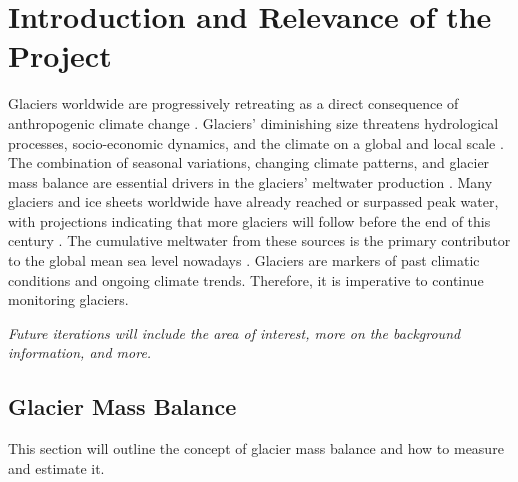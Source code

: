 \section{Introduction and Relevance of the Project}\label{introduction}
Glaciers worldwide are progressively retreating as a direct consequence of anthropogenic climate change \cite{immerzeel-2019, marzeion-2014, hugonnet-2021}. Glaciers' diminishing size threatens hydrological processes, socio-economic dynamics, and the climate on a global and local scale \cite{roberts-2022}. The combination of seasonal variations, changing climate patterns, and glacier mass balance are essential drivers in the glaciers' meltwater production \cite{viviroli-2011}. Many glaciers and ice sheets worldwide have already reached or surpassed peak water, with projections indicating that more glaciers will follow before the end of this century \cite{huss-2018}. The cumulative meltwater from these sources is the primary contributor to the global mean sea level nowadays \cite{roberts-2022}. Glaciers are markers of past climatic conditions and ongoing climate trends. Therefore, it is imperative to continue monitoring glaciers.

\textit{Future iterations will include the area of interest, more on the background information, and more.}


\subsection{Glacier Mass Balance}\label{glacier mass balance}
This section will outline the concept of glacier mass balance and how to measure and estimate it. 

